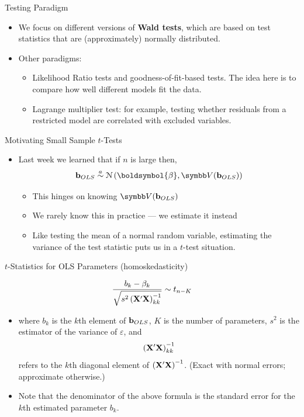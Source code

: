 \documentclass[aspectratio=169,11pt]{beamer}
\begin{document}
\begin{frame}{Testing Paradigm}
\begin{itemize}

	\item We focus on different versions of {\bf Wald tests}, which are based on test 
	statistics that are (approximately) normally distributed.

	\medskip
	\item Other paradigms:
	\begin{itemize}
		\item Likelihood Ratio tests and goodness-of-fit-based tests. The idea here is to compare how well
		different models fit the data.

		\item Lagrange multiplier test: for example, testing whether residuals from a restricted model are
		correlated with excluded variables. 
	\end{itemize}
\end{itemize}
\end{frame}


\begin{frame}{Motivating Small Sample $t$-Tests}
\begin{itemize}
	\item Last week we learned that if $n$ is large then,
	\[
		{\bf b}_{OLS} \stackrel{a}{\sim}\mathcal{N}\left(\boldsymbol{\beta},\Var({\bf b}_{OLS})\right)
	\]
	\begin{itemize}
		\item This hinges on knowing $\Var({\bf b}_{OLS})$
		\item We rarely know this in practice --- we estimate it instead
		\item Like testing the mean of a normal random variable, estimating the variance
		of the test statistic puts us in a $t$-test situation.
	\end{itemize}
\end{itemize}
\end{frame}

\begin{frame}{$t$-Statistics for OLS Parameters (homoskedasticity)}

\[
\frac{b_{k} - \beta_k}{\sqrt{s^2 \left( {\bf X}' {\bf X}\right)^{-1}_{kk}}} \sim t_{n-K}
\]

\begin{itemize}
	\item where $b_k$ is the $k$th element of ${\bf b}_{OLS}$, $K$ is the number of parameters,  $s^2$ is the estimator of
	the variance of $\varepsilon$, and \[
	\left( {\bf X}' {\bf X}\right)^{-1}_{kk}
	\]
	refers to the $k$th diagonal element of $\left( {\bf X}' {\bf X}\right)^{-1}$. (Exact with normal errors; approximate otherwise.)

	\item Note that the denominator of the above formula is the standard error for the $k$th
	estimated parameter $b_{k}$.

\end{itemize}
\end{frame}
\end{document}
